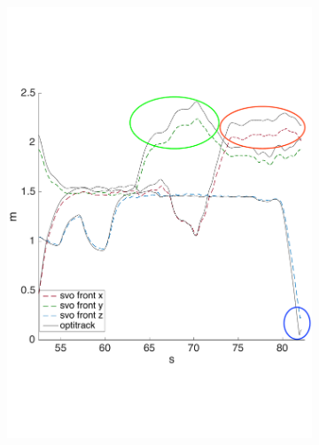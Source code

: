 \begin{figure}[!htbp]
  \centering
  \begin{subfigure}[b]{0.4\textwidth}
        \includegraphics[width=\textwidth]{img/fly_with_landing_position.pdf}
        \label{fig:comparision_svo_position_drifting}
   \end{subfigure} \\
   \begin{subfigure}[b]{0.4\textwidth}

\end{subfigure}
\end{figure}
